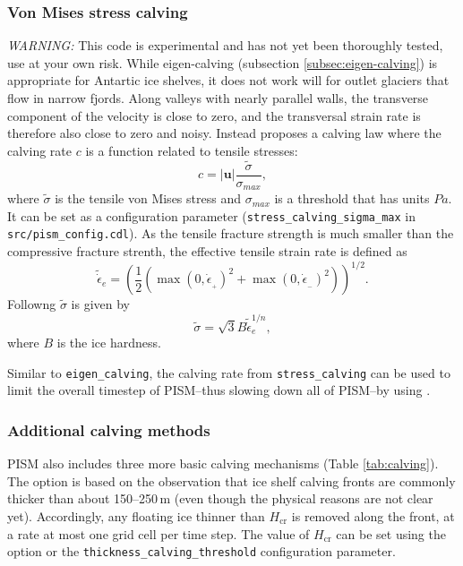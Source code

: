 \subsubsection{Von Mises stress calving}
\label{subsec:stress-calving}

\emph{WARNING:} This code is experimental and has not yet been thoroughly tested, use at your own risk. While eigen-calving (subsection \ref{subsec:eigen-calving}) is appropriate for Antartic ice shelves, it does not work will for outlet glaciers that flow in narrow  fjords. Along valleys with nearly parallel walls, the transverse component of the velocity is close to zero, and the transversal strain rate is therefore also close to zero and noisy. Instead \cite{Morlighem2016} proposes a calving law where the calving rate $c$ is a function related to tensile stresses:
\begin{equation}
\label{eq: calv3}
c = |\mathbf{u}| \frac{\tilde{\sigma}}{\sigma_{max}},
\end{equation}
where $\tilde{\sigma}$ is the tensile von Mises stress and $\sigma_{max}$ is a threshold that has units $Pa$. It can be set as a configuration parameter (\texttt{stress_calving_sigma_max} in \texttt{src/pism_config.cdl}). As the tensile fracture strength is much smaller than the compressive fracture strenth, the effective tensile strain rate is defined as 
\begin{equation}
\label{eq: calv4}
\tilde{\dot{\epsilon}}_e = \left(\frac{1}{2}\left(\max(0,\dot{\epsilon}_{_+})^2 + \max(0,\dot{\epsilon}_{_-})^2\right)\right)^{1/2}.
\end{equation}
Followng \cite{Morlighem2016} $\tilde{\sigma}$ is given by
\begin{equation}
\label{eq: calv5}
\tilde{\sigma} = \sqrt{3} B \tilde{\dot{{\epsilon}}}_e^{1/n},
\end{equation}
where $B$ is the ice hardness.

Similar to \texttt{eigen_calving}, the calving rate from \texttt{stress_calving} can be used to limit the overall timestep of PISM--thus slowing down all of PISM--by using .

\subsubsection{Additional calving methods}
\label{subsec:additional-calving}


PISM also includes three more basic calving mechanisms (Table \ref{tab:calving}). The option  is based on the observation that ice shelf calving fronts are commonly thicker than about 150--250\,m (even though the physical reasons are not clear yet). Accordingly, any floating ice thinner than $H_{\textrm{cr}}$ is removed along the front, at a rate at most one grid cell per time step. The value of $H_{\mathrm{cr}}$ can be set using the  option or the \texttt{thickness_calving_threshold} configuration parameter.

